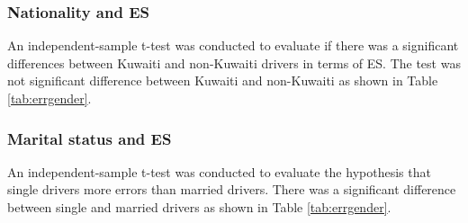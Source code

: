\documentclass[preprint,12pt,a4paper,authoryear]{elsarticle}
\begin{document}
\subsubsection{Nationality and ES }
An independent-sample t-test was conducted to evaluate if there was a significant differences between Kuwaiti and non-Kuwaiti drivers in terms of ES. The test was not significant difference between Kuwaiti and non-Kuwaiti as shown in Table \ref{tab:errgender}.

\subsubsection{Marital status and ES}
An independent-sample t-test was conducted to evaluate the hypothesis that single drivers more errors than married drivers. There was a significant difference between single and married drivers as shown in Table \ref{tab:errgender}.

\begin{table}[H]
\centering
\caption{Results of t-tests for ES.}
\label{tab:errgender}
\end{table}
\end{document}
